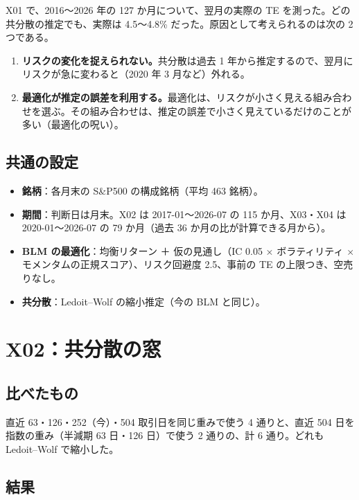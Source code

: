 \documentclass[xelatex,ja=standard,jafont=haranoaji,a4paper,10pt,openany]{bxjsreport}
\newcommand{\SP}{S\&P500}
\begin{document}
X01 で、2016〜2026 年の 127 か月について、翌月の実際の TE を測った。どの共分散の推定でも、実際は 4.5〜4.8\% だった。原因として考えられるのは次の 2 つである。

\begin{enumerate}
\item \textbf{リスクの変化を捉えられない。}共分散は過去 1 年から推定するので、翌月にリスクが急に変わると（2020 年 3 月など）外れる。
\item \textbf{最適化が推定の誤差を利用する。}最適化は、リスクが小さく見える組み合わせを選ぶ。その組み合わせは、推定の誤差で小さく見えているだけのことが多い（最適化の呪い）。
\end{enumerate}

\section{共通の設定}

\begin{itemize}
\item \textbf{銘柄}：各月末の \SP{} の構成銘柄（平均 463 銘柄）。
\item \textbf{期間}：判断日は月末。X02 は 2017-01〜2026-07 の 115 か月、X03・X04 は 2020-01〜2026-07 の 79 か月（過去 36 か月の比が計算できる月から）。
\item \textbf{BLM の最適化}：均衡リターン ＋ 仮の見通し（IC 0.05 × ボラティリティ × モメンタムの正規スコア）、リスク回避度 2.5、事前の TE の上限つき、空売りなし。
\item \textbf{共分散}：Ledoit--Wolf の縮小推定（今の BLM と同じ）。
\end{itemize}

\chapter{X02：共分散の窓}\label{ch:x02}

\section{比べたもの}

直近 63・126・252（今）・504 取引日を同じ重みで使う 4 通りと、直近 504 日を指数の重み（半減期 63 日・126 日）で使う 2 通りの、計 6 通り。どれも Ledoit--Wolf で縮小した。

\section{結果}
\end{document}
